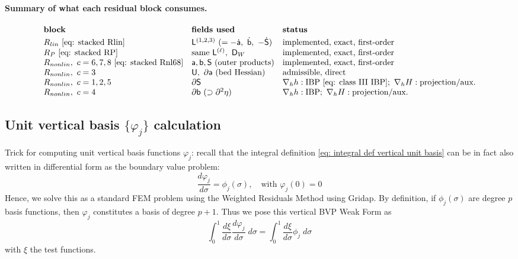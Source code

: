 \documentclass{article}
\newcommand{\nablah}{\nabla_h}
\newcommand{\phij}{\phi_j(\sigma)}
\newcommand{\vphij}{\varphi_j}
\begin{document}
\paragraph{Summary of what each residual block consumes.}
$$
\begin{array}{lll}
\textbf{block} & \textbf{fields used} & \textbf{status}\\[1mm]
R_{lin} \ \eqref{eq: stacked Rlin} & \mathsf{L}^{(1,2,3)} \ (= -\dot{\mathsf{a}},\ \dot{\mathsf{b}},\ -\dot{\mathsf{S}}) & \text{implemented, exact, first-order}\\
R_{P} \ \eqref{eq: stacked RP} & \text{same } \mathsf{L}^{(\ell)},\ \mathsf{D}_W & \text{implemented, exact, first-order}\\
R_{nonlin},\ c=6,7,8 \ \eqref{eq: stacked Rnl68} & \mathsf{a},\mathsf{b},\mathsf{S} \text{ (outer products)} & \text{implemented, exact, first-order}\\
R_{nonlin},\ c=3 & \mathsf{U},\ \partial\mathsf{a} \ (\text{bed Hessian}) & \text{admissible, direct}\\
R_{nonlin},\ c=1,2,5 & \partial\mathsf{S} & \nablah h: \text{IBP \eqref{eq: class III IBP}};\ \nablah H: \text{projection/aux.}\\
R_{nonlin},\ c=4 & \partial\mathsf{b} \ (\supset \partial^2\eta) & \nablah h: \text{IBP};\ \nablah H: \text{projection/aux.}
\end{array}
$$





\subsection*{Unit vertical basis $\{\vphij\}$ calculation}

Trick for computing unit vertical basis functions $\vphij$: recall that the integral definition \eqref{eq: integral def vertical unit basis} can be in fact also written in differential form as the boundary value problem:
\begin{equation*}
    \frac{d\vphij}{d\sigma} = \phi_j(\sigma), \quad \text{with } \vphij(0) = 0
\end{equation*}
Hence, we solve this as a standard FEM problem using the Weighted Residuals Method using Gridap. 
By definition, if $\phij$ are degree $p$ basis functions, then $\vphij$ constitutes a basis of degree $p+1$. 
Thus we pose this vertical BVP Weak Form as
$$\int_0^1 \frac{d\xi}{d\sigma}\frac{d\vphij}{d\sigma} \;d\sigma = \int_0^1 \frac{d\xi}{d\sigma}\phi_j \;d\sigma$$
with $\xi$ the test functions.
\end{document}
